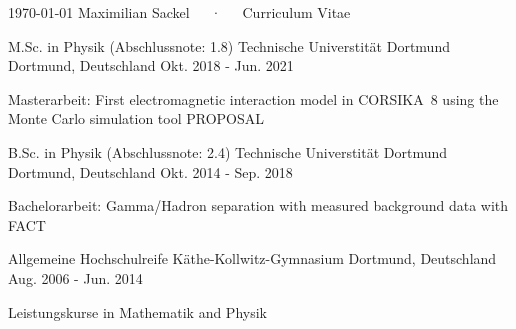 \documentclass[11pt, a4paper]{Awesome-CV/awesome-cv}
\begin{document}
\makecvheader

\makecvfooter
{\today}
{Maximilian Sackel~~~·~~~Curriculum Vitae}
{\thepage}




\begin{cventries}
    \cventry
    {M.Sc. in Physik \quad (Abschlussnote: 1.8)} %
    {Technische Universtität Dortmund} %
    {Dortmund, Deutschland} %
    {Okt. 2018 - Jun. 2021} %
    {
        \begin{cvitems} %
        \item {Masterarbeit: First electromagnetic interaction model in CORSIKA~8 using the Monte Carlo simulation tool PROPOSAL}
        \end{cvitems}
    }%

    \cventry
    {B.Sc. in Physik \quad (Abschlussnote: 2.4)} %
    {Technische Universtität Dortmund} %
    {Dortmund, Deutschland} %
    {Okt. 2014 - Sep. 2018} %
    {
        \begin{cvitems} %
        \item {Bachelorarbeit: Gamma/Hadron separation with measured background data with FACT}
        \end{cvitems}
    }%

    \cventry
    {Allgemeine Hochschulreife} %
    {Käthe-Kollwitz-Gymnasium} %
    {Dortmund, Deutschland} %
    {Aug. 2006 - Jun. 2014} %
    {
        \begin{cvitems} %
        \item {Leistungskurse in Mathematik and Physik}
        \end{cvitems}
    }%
\end{cventries}
\end{document}
